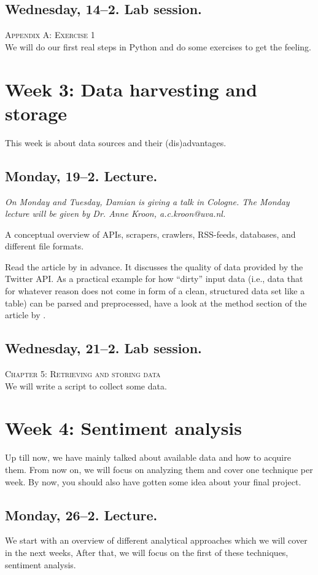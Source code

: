 \documentclass[a4paper,10pt]{report}
\begin{document}
\subsection*{Wednesday, 14--2. Lab session.}
\textsc{ Appendix A: Exercise 1}\\
We will do our first real steps in Python and do some exercises to get the feeling. 


\section*{Week 3: Data harvesting and storage}
This week is about data sources and their (dis)advantages. 

\subsection*{Monday, 19--2. Lecture.}
\emph{On Monday and Tuesday, Damian is giving a talk in Cologne. The Monday lecture will be given by Dr. Anne Kroon, a.c.kroon@uva.nl.}

A conceptual overview of APIs, scrapers, crawlers, RSS-feeds, databases, and different file formats.

Read the article by \cite{Morstatter2013} in advance. It discusses the quality of data provided by the Twitter API. As a practical example for how ``dirty'' input data (i.e., data that for whatever reason does not come in form of a clean, structured data set like a table) can be parsed and preprocessed, have a look at the method section of the article by \cite{Lewis2013}. 


\subsection*{Wednesday, 21--2. Lab session.}
\textsc{ Chapter 5: Retrieving and storing data}\\
We will write a script to collect some data. 




\section*{Week 4: Sentiment analysis}
Up till now, we have mainly talked about available data and how to acquire them. From now on, we will focus on analyzing them and cover one technique per week. By now, you should also have gotten some idea about your final project.


\subsection*{Monday, 26--2. Lecture.}
We start with an overview of different analytical approaches which we will cover in the next weeks, After that, we will focus on the first of these techniques, sentiment analysis.
\end{document}
